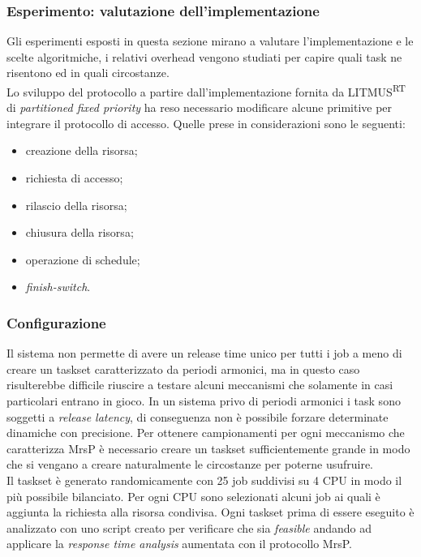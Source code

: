 \subsubsection{Esperimento: valutazione dell'implementazione}
\label{sec:overhead_exp}

\noindent Gli esperimenti esposti in questa sezione mirano a valutare l'implementazione e le scelte algoritmiche, i relativi overhead vengono studiati per capire quali task ne risentono ed in quali circostanze.\\

\noindent Lo sviluppo del protocollo a partire dall'implementazione fornita da LITMUS\textsuperscript{RT} di \textit{partitioned fixed priority} ha reso necessario modificare alcune primitive per integrare il protocollo di accesso. Quelle prese in considerazioni sono le seguenti:

\begin{itemize}
	\item creazione della risorsa;
	\item richiesta di accesso;
	\item rilascio della risorsa;
	\item chiusura della risorsa;
	\item operazione di schedule;
	\item \textit{finish-switch}.
\end{itemize}

\subsubsection{Configurazione}
\label{sec:overhead_conf}

\noindent Il sistema non permette di avere un release time unico per tutti i job a meno di creare un taskset caratterizzato da periodi armonici, ma in questo caso risulterebbe difficile riuscire a testare alcuni meccanismi che solamente in casi particolari entrano in gioco. In un sistema privo di periodi armonici i task sono soggetti a \textit{release latency}, di conseguenza non è possibile forzare determinate dinamiche con precisione. Per ottenere campionamenti per ogni meccanismo che caratterizza MrsP è necessario creare un taskset sufficientemente grande in modo che si vengano a creare naturalmente le circostanze per poterne usufruire.\\
\noindent Il taskset è generato randomicamente con 25 job suddivisi su 4 CPU in modo il più possibile bilanciato. Per ogni CPU sono selezionati alcuni job ai quali è aggiunta la richiesta alla risorsa condivisa. Ogni taskset prima di essere eseguito è analizzato con uno script creato per verificare che sia \textit{feasible} andando ad applicare la \textit{response time analysis} aumentata con il protocollo MrsP.\\

